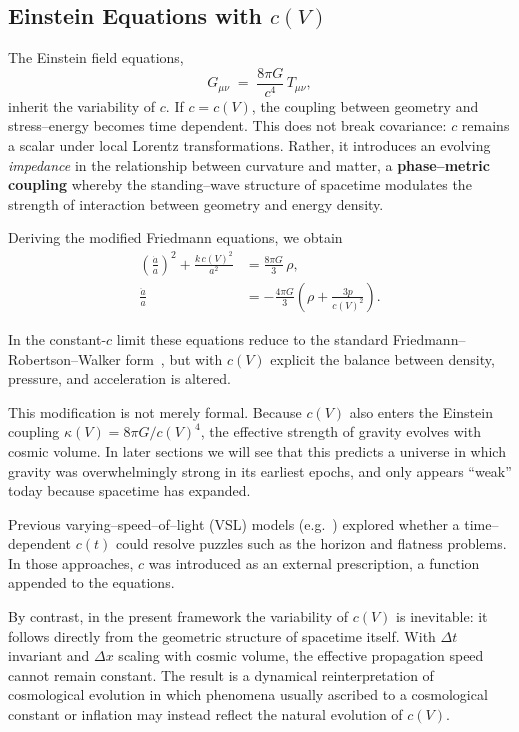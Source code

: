 \documentclass[12pt]{article}
\begin{document}
\subsection{Einstein Equations with \(c(V)\)}

The Einstein field equations,
\begin{equation}
  G_{\mu\nu} \;=\; \frac{8\pi G}{c^4}\,T_{\mu\nu},
\end{equation}
inherit the variability of \(c\).  If \(c = c(V)\), the coupling between geometry and stress–energy becomes time dependent.  This does not break covariance: \(c\) remains a scalar under local Lorentz transformations.  Rather, it introduces an evolving \emph{impedance} in the relationship between curvature and matter, a \textbf{phase–metric coupling} whereby the standing–wave structure of spacetime modulates the strength of interaction between geometry and energy density.

Deriving the modified Friedmann equations, we obtain
\begin{align}
  \left(\frac{\dot{a}}{a}\right)^2 + \frac{k\, c(V)^2}{a^2} &= \frac{8 \pi G}{3}\,\rho, \\
  \frac{\ddot{a}}{a} &= -\frac{4 \pi G}{3}\!\left( \rho + \frac{3p}{c(V)^2} \right).
\end{align}

In the constant-$c$ limit these equations reduce to the standard Friedmann–Robertson–Walker form~\cite{frw}, but with $c(V)$ explicit the balance between density, pressure, and acceleration is altered.  

This modification is not merely formal. Because $c(V)$ also enters the Einstein coupling $\kappa(V) = 8\pi G / c(V)^4$, the effective strength of gravity evolves with cosmic volume. In later sections we will see that this predicts a universe in which gravity was overwhelmingly strong in its earliest epochs, and only appears ``weak'' today because spacetime has expanded.

Previous varying–speed–of–light (VSL) models (e.g.\ \cite{albrecht1999,barrow1999,magueijo2003}) explored whether a time– dependent \(c(t)\) could resolve puzzles such as the horizon and flatness problems.  In those approaches, \(c\) was introduced as an external prescription, a function appended to the equations.

By contrast, in the present framework the variability of \(c(V)\) is inevitable: it follows directly from the geometric structure of spacetime itself.  With \(\Delta t\) invariant and \(\Delta x\) scaling with cosmic volume, the effective propagation speed cannot remain constant.  The result is a dynamical reinterpretation of cosmological evolution in which phenomena usually ascribed to a cosmological constant or inflation may instead reflect the natural evolution of \(c(V)\).
\end{document}
